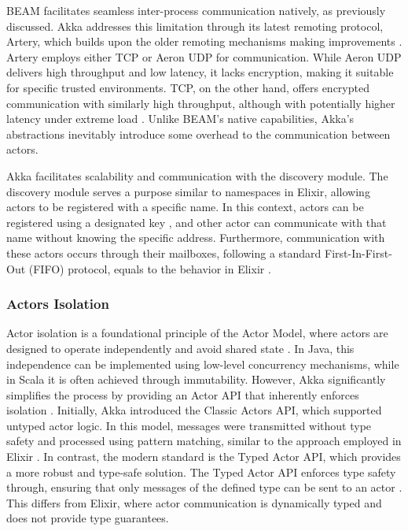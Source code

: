 BEAM facilitates seamless inter-process communication natively, as previously discussed. Akka addresses this limitation through its latest remoting protocol, Artery, which builds upon the older remoting mechanisms making improvements \cite{akka-docs,Abraham2023}. Artery employs either TCP or Aeron UDP for communication. While Aeron UDP delivers high throughput and low latency, it lacks encryption, making it suitable for specific trusted environments. TCP, on the other hand, offers encrypted communication with similarly high throughput, although with potentially higher latency under extreme load \cite{akka-docs}. Unlike BEAM’s native capabilities, Akka’s abstractions inevitably introduce some overhead to the communication between actors.

Akka facilitates scalability and communication with the discovery module. The discovery module serves a purpose similar to namespaces in Elixir, allowing actors to be registered with a specific name. In this context, actors can be registered using a designated key \cite{Abraham2023}, and other actor can communicate with that name without knowing the specific address. Furthermore, communication with these actors occurs through their mailboxes, following a standard First-In-First-Out (FIFO) protocol, equals to the behavior in Elixir \cite{Moamen2027,Juric2024}.

\subsubsection{Actors Isolation}

Actor isolation is a foundational principle of the Actor Model, where actors are designed to operate independently and avoid shared state \cite{Armstrong2013}. In Java, this independence can be implemented using low-level concurrency mechanisms, while in Scala it is often achieved through immutability. However, Akka significantly simplifies the process by providing an Actor API that inherently enforces isolation \cite{Abraham2023,Bagherzadeh2020}. Initially, Akka introduced the Classic Actors API, which supported untyped actor logic. In this model, messages were transmitted without type safety and processed using pattern matching, similar to the approach employed in Elixir \cite{akka-docs}. In contrast, the modern standard is the Typed Actor API, which provides a more robust and type-safe solution. The Typed Actor API enforces type safety through, ensuring that only messages of the defined type can be sent to an actor \cite{Abraham2023,akka-docs}. This differs from Elixir, where actor communication is dynamically typed and does not provide type guarantees.

